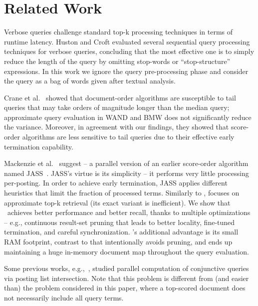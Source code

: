 \section{Related Work}
\label{sec:related}

Verbose queries challenge standard top-k processing techniques in terms of runtime latency. Huston and Croft \cite{Huston:2010} evaluated several sequential query processing techniques for verbose queries, concluding that the most effective one is to simply reduce the length of the query by omitting stop-words or ``stop-structure'' expressions. 
In this work we ignore the query pre-processing phase and consider the query as a bag of words given after textual analysis.

Crane et al.~\cite{Crane:2017} showed that  document-order algorithms 
are susceptible to tail queries that may take orders of magnitude longer than the median query; approximate query evaluation in WAND and BMW does not significantly reduce the variance. Moreover, in agreement with our findings, they showed that score-order algorithms  are less sensitive to tail queries due to their effective early termination capability. 

Mackenzie et al.~\cite{parallel-jass} suggest \pJASS -- a parallel version of an earlier score-order algorithm named JASS~\cite{Lin:2015}. JASS's virtue is its simplicity -- 
it performs very little processing per-posting. In order to achieve early termination, JASS applies different heuristics that limit the fraction of processed terms. 
Similarly to \alg, \pJASS\/ focuses on approximate top-k retrieval (its exact variant is inefficient). We show that \alg\ achieves better performance and better recall, thanks to multiple optimizations -- e.g., continuous result-set pruning that leads to better locality, fine-tuned termination, and careful synchronization. \alg's additional advantage is its small RAM footprint, contrast to \pJASS\/ that intentionally avoids pruning, and ends up maintaining a huge in-memory document map throughout the query evaluation. 

Some previous works,  e.g.,~\cite{Tatikonda:2011,Liu:2018:GUC:3178487.3178512}, studied parallel computation  of conjunctive queries  via posting list intersection. 
Note that this problem is different from (and easier than) the problem considered in this paper, where a top-scored document does not necessarily include all query terms. 

